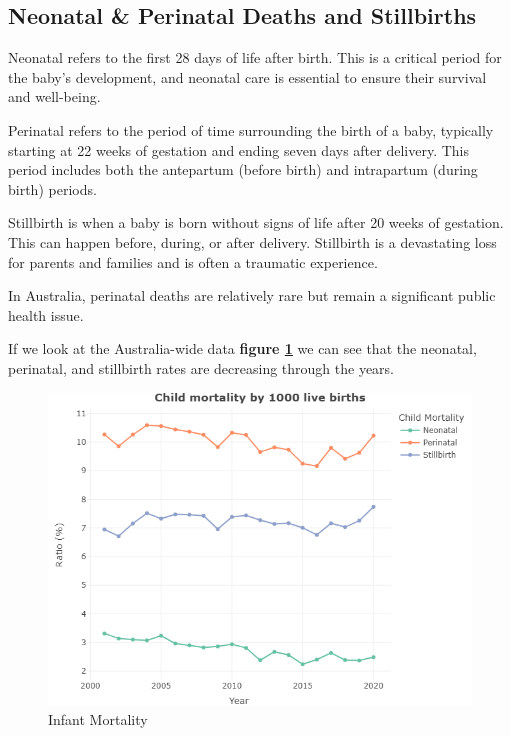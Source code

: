 \subsection{Neonatal \& Perinatal Deaths and Stillbirths}
Neonatal refers to the first 28 days of life after birth. This is a critical period for the baby's development, and neonatal care is essential to ensure their survival and well-being.

Perinatal refers to the period of time surrounding the birth of a baby, typically starting at 22 weeks of gestation and ending seven days after delivery. This period includes both the antepartum (before birth) and intrapartum (during birth) periods.

Stillbirth is when a baby is born without signs of life after 20 weeks of gestation. This can happen before, during, or after delivery. Stillbirth is a devastating loss for parents and families and is often a traumatic experience.

In Australia, perinatal deaths are relatively rare but remain a significant public health issue.

If we look at the Australia-wide data \textbf{figure \ref{fig:neo-rate}} we can see that the neonatal, perinatal, and stillbirth rates are decreasing through the years.

\begin{figure}
  \centering
  \includegraphics[width=.5\textwidth]{img/aus/kanishka/infant_mortality.png}
  \caption{Infant Mortality}
  \label{fig:neo-rate}
\end{figure}




